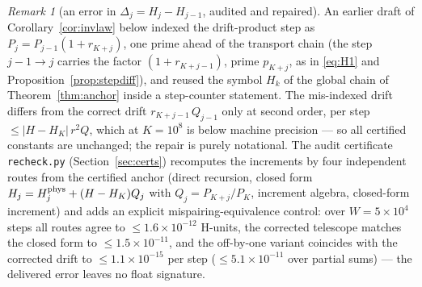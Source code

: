 \documentclass[11pt]{article}
\theoremstyle{remark}
\newtheorem{remark}[theorem]{Remark}
\begin{document}
\begin{remark}[an error in $\Delta_j=H_j-H_{j-1}$, audited and
repaired]\label{rem:recheck}
An earlier draft of Corollary~\ref{cor:invlaw} below indexed the
drift-product step as $P_j=P_{j-1}(1+r_{K+j})$, one prime ahead of the
transport chain (the step $j-1\to j$ carries the factor
$(1+r_{K+j-1})$, prime $p_{K+j}$, as in \eqref{eq:H1} and
Proposition~\ref{prop:stepdiff}), and reused the symbol $H_k$ of the
global chain of Theorem~\ref{thm:anchor} inside a step-counter
statement. The mis-indexed drift differs from the correct drift
$r_{K+j-1}\,Q_{j-1}$ only at second order, per step
$\le|H-H_K|\,r^2Q$, which at $K=10^8$ is below machine precision
--- so all certified constants are unchanged; the repair is purely
notational. The audit certificate \texttt{recheck.py}
(Section~\ref{sec:certs}) recomputes the increments by four
independent routes from the certified anchor (direct recursion, closed
form $H_j=H^{\rm phys}_j+(H-H_K)Q_j$ with $Q_j=P_{K+j}/P_K$, increment
algebra, closed-form increment) and adds an explicit
mispairing-equivalence control: over $W=5\times10^4$ steps all routes
agree to $\le1.6\times10^{-12}$ H-units, the corrected telescope
matches the closed form to $\le1.5\times10^{-11}$, and the off-by-one
variant coincides with the corrected drift to $\le1.1\times10^{-15}$
per step ($\le5.1\times10^{-11}$ over partial sums) --- the delivered
error leaves no float signature.
\end{remark}
\end{document}
